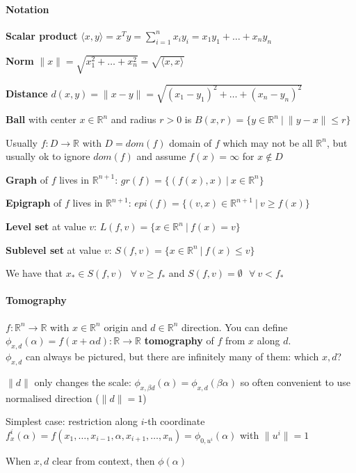 \documentclass[10pt]{report}
\begin{document}
\paragraph{Notation}\begin{list}{}{}
	\item \textbf{Scalar product} $\langle x,y\rangle = x^Ty = \sum_{i=1}^n x_iy_i = x_1y_1+\ldots+x_ny_n$
	\item \textbf{Norm} $\|x\| = \sqrt{x_1^2+\ldots+x_n^2} = \sqrt{\langle x,x\rangle}$
	\item \textbf{Distance} $d(x,y) = \|x-y\| = \sqrt{(x_1-y_1)^2+\ldots+(x_n-y_n)^2}$
	\item \textbf{Ball} with center $x\in \mathbb{R}^n$ and radius $r > 0$ is $B(x,r) = \{y\in \mathbb{R}^n\:|\:\|y-x\|\leq r\}$
\end{list}
Usually $f:D\rightarrow \mathbb{R}$ with $D = dom(f)$ domain of $f$ which may not be all $\mathbb{R}^n$, but usually ok to ignore $dom(f)$ and assume $f(x)=\infty$ for $x\not\in D$
\begin{list}{}{}
	\item \textbf{Graph} of $f$ lives in $\mathbb{R}^{n+1}$: $gr(f) = \{(f(x),x)\:|\:x\in \mathbb{R}^n\}$
	\item \textbf{Epigraph} of $f$ lives in $\mathbb{R}^{n+1}$: $epi(f)=\{(v,x) \in \mathbb{R}^{n+1}\:|\:v\geq f(x)\}$
	\item \textbf{Level set} at value $v$: $L(f,v)=\{x\in \mathbb{R}^n\:|\:f(x)=v\}$
	\item \textbf{Sublevel set} at value $v$: $S(f,v)=\{x\in \mathbb{R}^n\:|\:f(x)\leq v\}$
\end{list}
We have that $x_* \in S(f,v)\:\:\:\forall\:v\geq f_*$ and $S(f,v) = \emptyset\:\:\:\forall\:v<f_*$

\paragraph{Tomography} $f:\mathbb{R}^n \rightarrow \mathbb{R}$ with $x\in \mathbb{R}^n$ origin and $d\in \mathbb{R}^n$ direction. You can define $\phi_{x,d}(\alpha) = f(x + \alpha d): \mathbb{R} \rightarrow \mathbb{R}$ \textbf{tomography} of $f$ from $x$ along $d$.\\
$\phi_{x,d}$ can always be pictured, but there are infinitely many of them: which $x,d$?\begin{list}{}{}
	\item $\|d\|$ only changes the scale: $\phi_{x,\beta d}(\alpha) = \phi_{x,d}(\beta \alpha)$ so often convenient to use normalised direction ($\|d\| = 1$)
	\item Simplest case: restriction along $i$-th coordinate\\
	$f_x^i(\alpha) = f(x_1,\ldots,x_{i-1},\alpha,x_{i+1},\ldots,x_n) = \phi_{0,u^i}(\alpha)$ with $\|u^i\| = 1$
	\item When $x,d$ clear from context, then $\phi(\alpha)$
\end{list}
\end{document}

